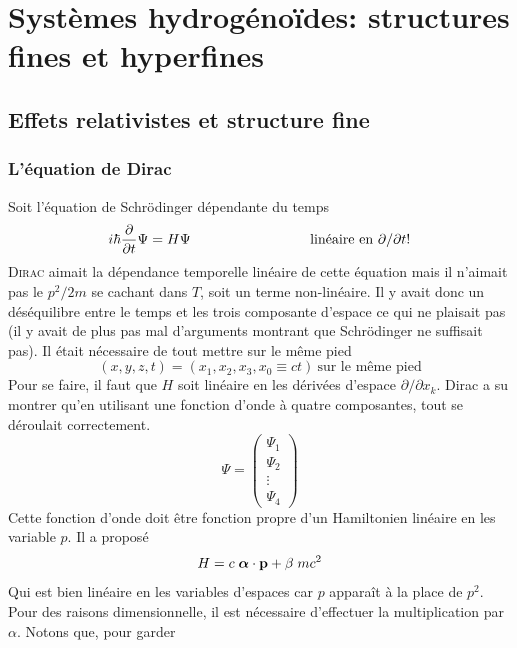 \chapter{Systèmes hydrogénoïdes: structures fines et hyperfines}

\section{Effets relativistes et structure fine}
\subsection{L'équation de Dirac}
Soit l'équation de Schrödinger dépendante du temps
\begin{equation}
i \hbar \frac{\partial}{\partial t} \Psi = H \Psi 
\hspace*{3cm} \mbox{lin\'eaire en}~\partial/\partial t !
\end{equation}
\textsc{Dirac} aimait la dépendance temporelle linéaire de cette équation mais il n'aimait pas le 
$p^2/2m$ se cachant dans $T$, soit un terme non-linéaire. Il y avait donc un déséquilibre entre 
le temps et les trois composante d'espace ce qui ne plaisait pas (il y avait de plus pas mal 
d'arguments montrant que Schrödinger ne suffisait pas). Il était nécessaire de tout mettre sur
le même pied
\begin{equation}
(x,y,z,t) = (x_1,x_2,x_3, x_0 \equiv ct) ~\mbox{sur le m\^eme pied}
\end{equation}
Pour se faire, il faut que $H$ soit linéaire en les dérivées d'espace $\partial/\partial x_k$. 
Dirac a su montrer qu'en utilisant une fonction d'onde à quatre composantes, tout se déroulait 
correctement.
\begin{equation}
\Psi = \left(
\begin{array}{c} \Psi_1 \\ \Psi_2 \\ \vdots \\ 
\Psi_4 \end{array}
\right)
\end{equation}
Cette fonction d'onde doit être fonction propre d'un Hamiltonien linéaire en les variable $p$. Il a 
proposé
\begin{equation}
H = c \; \mbox{\boldmath $ \alpha $} \cdot {\bf p}
  + \beta \; mc^2
\end{equation}
Qui est bien linéaire en les variables d'espaces car $p$ apparaît à la place de $p^2$. Pour des raisons
dimensionnelle, il est nécessaire d'effectuer la multiplication par $\alpha$. Notons que, pour garder
